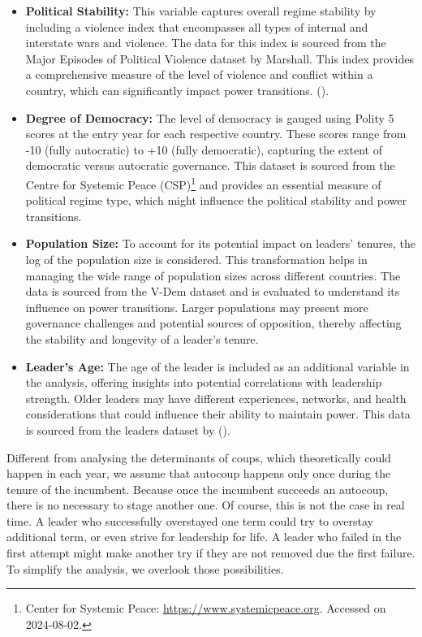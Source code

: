 \documentclass[
  12pt,
]{report}
\begin{document}
\begin{itemize}
\item
  \textbf{Political Stability:} This variable captures overall regime
  stability by including a violence index that encompasses all types of
  internal and interstate wars and violence. The data for this index is
  sourced from the Major Episodes of Political Violence dataset by
  Marshall. This index provides a comprehensive measure of the level of
  violence and conflict within a country, which can significantly impact
  power transitions. ().
\item
  \textbf{Degree of Democracy:} The level of democracy is gauged using
  Polity 5 scores at the entry year for each respective country. These
  scores range from -10 (fully autocratic) to +10 (fully democratic),
  capturing the extent of democratic versus autocratic governance. This
  dataset is sourced from the Centre for Systemic Peace (CSP)\footnote{Center
    for Systemic Peace: \url{https://www.systemicpeace.org}. Accessed on
    2024-08-02.} and provides an essential measure of political regime
  type, which might influence the political stability and power
  transitions.
\item
  \textbf{Population Size:} To account for its potential impact on
  leaders' tenures, the log of the population size is considered. This
  transformation helps in managing the wide range of population sizes
  across different countries. The data is sourced from the V-Dem dataset
  and is evaluated to understand its influence on power transitions.
  Larger populations may present more governance challenges and
  potential sources of opposition, thereby affecting the stability and
  longevity of a leader's tenure.
\item
  \textbf{Leader's Age:} The age of the leader is included as an
  additional variable in the analysis, offering insights into potential
  correlations with leadership strength. Older leaders may have
  different experiences, networks, and health considerations that could
  influence their ability to maintain power. This data is sourced from
  the leaders dataset by ().
\end{itemize}

Different from analysing the determinants of coups, which theoretically
could happen in each year, we assume that autocoup happens only once
during the tenure of the incumbent. Because once the incumbent succeeds
an autocoup, there is no necessary to stage another one. Of course, this
is not the case in real time. A leader who successfully overstayed one
term could try to overstay additional term, or even strive for
leadership for life. A leader who failed in the first attempt might make
another try if they are not removed due the first failure. To simplify
the analysis, we overlook those possibilities.
\end{document}
